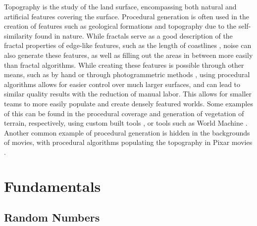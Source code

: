 \documentclass[10pt]{report}
\begin{document}
		Topography is the study of the land surface, encompassing both natural and artificial features covering the surface. Procedural generation is often used in the creation of features such as geological formations and topography due to the self-similarity found in nature. While fractals serve as a good description of the fractal properties of edge-like features, such as the length of coastlines \cite{ijgi5060095}, noise can also generate these features, as well as filling out the areas in between more easily than fractal algorithms. While creating these features is possible through other means, such as by hand or through photogrammetric methods \cite{bullinger2020photogrammetrybased}, using procedural algorithms allows for easier control over much larger surfaces, and can lead to similar quality results with the reduction of manual labor. This allows for smaller teams to more easily populate and create densely featured worlds. Some examples of this can be found in the procedural coverage and generation of vegetation of terrain, respectively, using custom built tools \cite{redengine}, or tools such as World Machine \cite{world-machine}. Another common example of procedural generation is hidden in the backgrounds of movies, with procedural algorithms populating the topography in Pixar movies \cite{10.1145/3388767.3407372}.
		
		\section{Fundamentals} 
			\subsection{Random Numbers} \label{subsec:rng}
		
\end{document}
